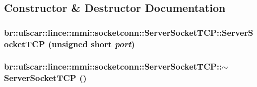 \subsection{Constructor \& Destructor Documentation}
\hypertarget{classbr_1_1ufscar_1_1lince_1_1mmi_1_1socketconn_1_1ServerSocketTCP_a333eaf37843a6b92be8409057c0912d4}{
\subsubsection[{ServerSocketTCP}]{\setlength{\rightskip}{0pt plus 5cm}br::ufscar::lince::mmi::socketconn::ServerSocketTCP::ServerSocketTCP (unsigned short {\em port})}}
\label{classbr_1_1ufscar_1_1lince_1_1mmi_1_1socketconn_1_1ServerSocketTCP_a333eaf37843a6b92be8409057c0912d4}
\hypertarget{classbr_1_1ufscar_1_1lince_1_1mmi_1_1socketconn_1_1ServerSocketTCP_a5fe635a8624663152769239eb15bb32d}{
\subsubsection[{$\sim$ServerSocketTCP}]{\setlength{\rightskip}{0pt plus 5cm}br::ufscar::lince::mmi::socketconn::ServerSocketTCP::$\sim$ServerSocketTCP ()}}
\label{classbr_1_1ufscar_1_1lince_1_1mmi_1_1socketconn_1_1ServerSocketTCP_a5fe635a8624663152769239eb15bb32d}


